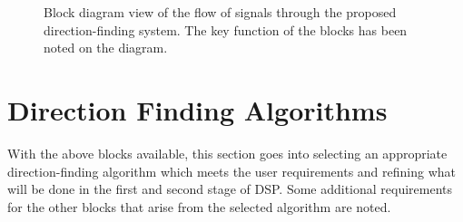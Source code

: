 \begin{landscape}
  \thispagestyle{empty}
  \begin{figure}
    \centering
  \caption{Block diagram view of the flow of signals through the proposed direction-finding system. The key function of the blocks has been noted on the diagram. }
  \label{fig:system-design:signal-flow}
  \end{figure}
\end{landscape}

\section{Direction Finding Algorithms}
With the above blocks available, this section goes into selecting an appropriate direction-finding algorithm which meets the user requirements and refining what will be done in the first and second stage of DSP. Some additional requirements for the other blocks that arise from the selected algorithm are noted. 

